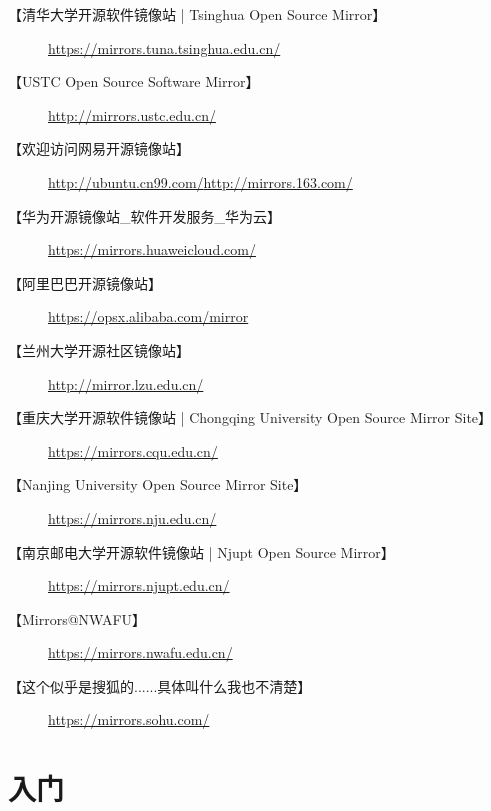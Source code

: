 \documentclass{book}
\begin{document}
\begin{description}
	\item [【清华大学开源软件镜像站 | Tsinghua Open Source Mirror】]\url{https://mirrors.tuna.tsinghua.edu.cn/}
	\item [【USTC Open Source Software Mirror】]\url{http://mirrors.ustc.edu.cn/}
	\item [【欢迎访问网易开源镜像站】]\url{http://ubuntu.cn99.com/}\url{http://mirrors.163.com/}
	\item [【华为开源镜像站\_软件开发服务\_华为云】]\url{https://mirrors.huaweicloud.com/}
	\item [【阿里巴巴开源镜像站】]\url{https://opsx.alibaba.com/mirror}
	\item [【兰州大学开源社区镜像站】]\url{http://mirror.lzu.edu.cn/}
	\item [【重庆大学开源软件镜像站 | Chongqing University Open Source Mirror Site】] \url{https://mirrors.cqu.edu.cn/}
	\item [【Nanjing University Open Source Mirror Site】] \url{https://mirrors.nju.edu.cn/}
	\item [【南京邮电大学开源软件镜像站 | Njupt Open Source Mirror】]\url{https://mirrors.njupt.edu.cn/}
	\item [【Mirrors@NWAFU】]\url{https://mirrors.nwafu.edu.cn/}
	\item [【这个似乎是搜狐的......具体叫什么我也不清楚】]\url{https://mirrors.sohu.com/}
\end{description}
\chapter{入门}
\end{document}
